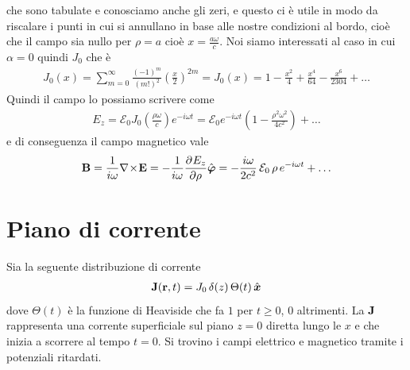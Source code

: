 che sono tabulate e conosciamo anche gli zeri, e questo ci è utile in modo da riscalare i punti in cui si annullano in base alle 
nostre condizioni al bordo, cioè che il campo sia nullo per $ \rho = a $ cioè $ x = \frac{a\omega}{c} $. Noi siamo interessati 
al caso in cui $ \alpha = 0 $ quindi $ J_0 $ che è
\begin{align}
  J_0(x)=\sum_{m=0}^{\infty} \frac{(-1)^m}{(m!)^2}\left(\frac{x}{2}\right)^{2m} = J_0(x)= 1 - \frac{x^2}{4} + \frac{x^4}{64} - \frac{x^6}{2304} + \dots
\end{align}
Quindi il campo lo possiamo scrivere come 
\begin{align}
  E_z = \mathcal{E}_0 J_0\left( \frac{\rho\omega}{c} \right) e^{-i\omega t} 
  = \mathcal{E}_0 e^{-i\omega t} \left( 1 - \frac{\rho^2 \omega^2}{4 c^2} \right) + \dots
\end{align}
e di conseguenza il campo magnetico vale
\begin{align}
  \mathbf{ B } = \frac{1}{i\omega} \nabla\!\times\!\mathbf{ E } = -\frac{1}{i\omega} \frac{\partial^{} {E_z}}{\partial {\rho}^{}} \hat{\boldsymbol{\varphi}}
  = - \frac{i\omega}{2 c^2}\, \mathcal{E}_0\, \rho \, e^{-i\omega t} + \dots
\end{align}

\section{Piano di corrente}
Sia la seguente distribuzione di corrente 
\begin{align}
  \mathbf{ J }(\mathbf{ r },t) = J_0 \, \delta(z) \, \Theta(t) \, \hat{\boldsymbol{x}}
\end{align}
dove $ \Theta(t) $ è la funzione di Heaviside che fa $ 1 $ per $ t \geq 0 $, $ 0 $ altrimenti. La $ \mathbf{ J } $ rappresenta una corrente superficiale 
sul piano $ z= 0 $ diretta lungo le $ x $ e che inizia a scorrere al tempo $ t = 0 $. Si trovino i campi elettrico e magnetico tramite i potenziali 
ritardati. \\

